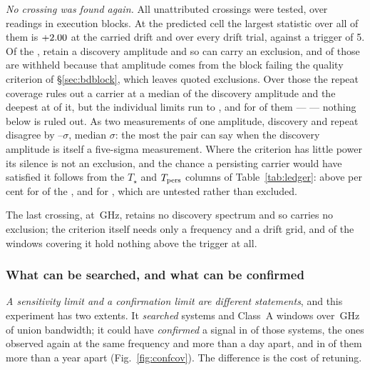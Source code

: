 \emph{No crossing was found again.} All \RcNTested{} unattributed crossings
were tested, over \RcNRepeatMeas{} readings in \RcNRepeatBlock{} execution
blocks. At the predicted cell the largest statistic over all of them is
$+2.00$ at the carried drift and \RcTMax{} over every drift trial,
against a trigger of 5. Of the \RcNTested, \RcNExclPoss{} retain a discovery
amplitude and so can carry an exclusion, and \RcNWithheld{} of those are
withheld because that amplitude comes from the block failing the quality
criterion of \S\ref{sec:bdblock}, which leaves \RcNExcl{} quoted
exclusions. Over those \RcNExcl{} the repeat coverage rules out a carrier
at a median \RcFracMed{} of the discovery amplitude and the deepest at
\RcFracMin{} of it, but the individual limits run to \RcFracMax, and for
\RcNFracWeak{} of them --- \RcFracWeakList{} --- nothing below
\RcFracWeakLo{} is ruled out. As two measurements of one amplitude, discovery
and repeat disagree by \RcExclMin--\RcExclMax$\sigma$, median
\RcExclMed$\sigma$: the most the pair can say when the discovery amplitude is
itself a five-sigma measurement. Where the criterion has little power its
silence is not an exclusion, and the chance a persisting carrier would have
satisfied it follows from the $T_\star$ and $T_{\rm pers}$ columns of
Table~\ref{tab:ledger}: above \RcPowerLevel{} per cent for \RcNPowerHi{} of
the \RcNExcl, and \RcPowerMin{} for \RcPowerLoList, which are untested
rather than excluded.

The last crossing, \RcUntStar{} at \RcUntFreq\,GHz, retains no discovery
spectrum and so carries no exclusion; the criterion itself needs only a
frequency and a drift grid, and \CtCritNEmpty{} of the \CtCritNCov{} windows
covering it hold nothing above the trigger at all.

\subsubsection{What can be searched, and what can be confirmed}
\label{sec:confirmability}

\emph{A sensitivity limit and a confirmation limit are different statements},
and this experiment has two extents. It \emph{searched} \RcSearchSys{} systems
and \RcSearchWin{} Class~A windows over \CvUnionA\,GHz of union bandwidth; it
could have \emph{confirmed} a signal in \RcConfSysDay{} of those systems, the
ones observed again at the same frequency and more than a day apart, and in
\RcConfSysYr{} of them more than a year apart (Fig.~\ref{fig:confcov}). The
difference is the cost of retuning.

